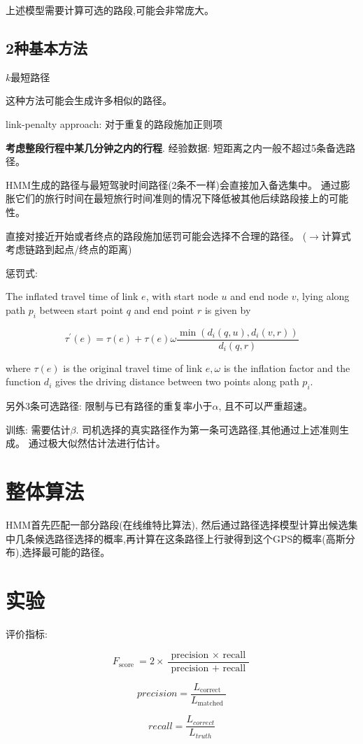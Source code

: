 上述模型需要计算可选的路段,可能会非常庞大。

\subsection{2种基本方法}

$k$最短路径

\begin{remark}
    这种方法可能会生成许多相似的路径。
\end{remark}

link-penalty approach: 对于重复的路段施加正则项

\textbf{考虑整段行程中某几分钟之内的行程}. 经验数据: 短距离之内一般不超过5条备选路径。 

HMM生成的路径与最短驾驶时间路径(2条不一样)会直接加入备选集中。 通过膨胀它们的旅行时间在最短旅行时间准则的情况下降低被其他后续路段接上的可能性。

\begin{remark}
    直接对接近开始或者终点的路段施加惩罚可能会选择不合理的路径。 ($\rightarrow$计算式考虑链路到起点/终点的距离)
\end{remark}

惩罚式:

\begin{definition}
    The inflated travel time of link $ e $, with start node $ u $ and end node $ v $, lying along path $ p_{i} $ between start point $ q $ and end point $ r $ is given by

$$ \tau^{\prime}(e)=\tau(e)+\tau(e) \omega \frac{\min \left(d_{i}(q, u), d_{i}(v, r)\right)}{d_{i}(q, r)} $$

where $ \tau(e) $ is the original travel time of link $ e, \omega $ is the inflation factor and the function $ d_{i} $ gives the driving distance
between two points along path $p_i$.
\end{definition}

另外3条可选路径: 限制与已有路径的重复率小于$\alpha$, 且不可以严重超速。

训练: 需要估计$\beta$. 司机选择的真实路径作为第一条可选路径,其他通过上述准则生成。 通过极大似然估计法进行估计。

\section{整体算法}

HMM首先匹配一部分路段(在线维特比算法), 然后通过路径选择模型计算出候选集中几条候选路径选择的概率,再计算在这条路径上行驶得到这个GPS的概率(高斯分布),选择最可能的路径。

\section{实验}

评价指标:

$$ F_{\text {score }}=2 \times \frac{\text { precision } \times \text { recall }}{\text { precision }+\text { recall }} $$

$$precision  =\frac{L_{\text {correct }}}{L_{\text {matched }}} $$

$$recall = \frac{L_{correct}}{L_{truth}}$$